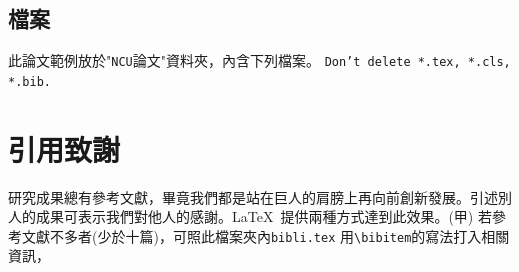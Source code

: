 \subsection{檔案}
此論文範例放於"{\tt NCU}論文"資料夾，內含下列檔案。
  
{\color{red} \Huge \tt Don't delete *.tex, *.cls, *.bib.} 
\section{引用致謝}
研究成果總有參考文獻，畢竟我們都是站在巨人的肩膀上再向前創新發展。引述別人的成果可表示我們對他人的感謝。\LaTeX\ 提供兩種方式達到此效果。(甲)
若參考文獻不多者(少於十篇)，可照此檔案夾內{\tt bibli.tex} 用\verb+\bibitem+的寫法打入相關資訊， %

